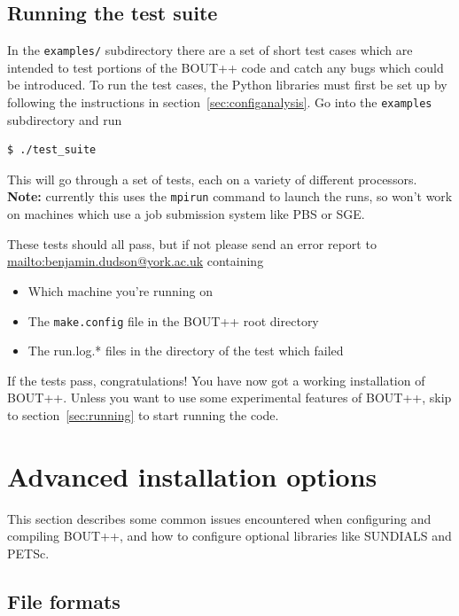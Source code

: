 \documentclass[12pt]{article}
\begin{document}
\subsection{Running the test suite}
\label{sec:runtestsuite}

In the \texttt{examples/} subdirectory there are a set of short test cases
which are intended to test portions of the BOUT++ code and catch any bugs
which could be introduced. To run the test cases, the Python libraries
must first be set up by following the instructions in section~\ref{sec:configanalysis}.
Go into the \texttt{examples} subdirectory and run
\begin{verbatim}
$ ./test_suite
\end{verbatim}

This will go through a set of tests,
each on a variety of different processors. {\bf Note:} currently this uses
the \texttt{mpirun} command to launch the runs, so won't work on machines which
use a job submission system like PBS or SGE.

These tests should all pass, but if not please send an error report to
\url{mailto:benjamin.dudson@york.ac.uk} containing
\begin{itemize}
\item Which machine you're running on
\item The \texttt{make.config} file in the BOUT++ root directory
\item The run.log.* files in the directory of the test which failed
\end{itemize}

If the tests pass, congratulations! You have now got a working installation of BOUT++.
Unless you want to use some experimental features of BOUT++, skip to section~\ref{sec:running}
to start running the code.

\section{Advanced installation options}
\label{sec:advancedinstall}

This section describes some common issues encountered when configuring
and compiling BOUT++, and how to configure optional libraries like
SUNDIALS and PETSc.

\subsection{File formats}
\end{document}
